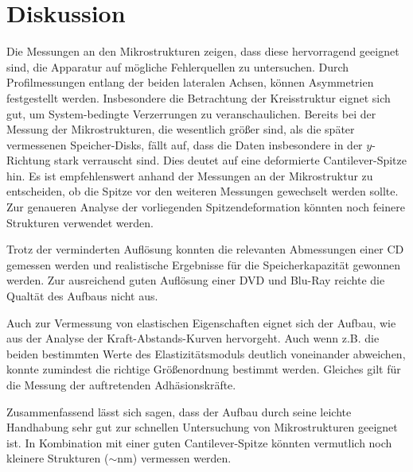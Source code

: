 \newpage
\section{Diskussion}
Die Messungen an den Mikrostrukturen zeigen, dass diese hervorragend geeignet sind, die Apparatur auf
mögliche Fehlerquellen zu untersuchen. Durch Profilmessungen entlang der beiden lateralen Achsen,
können Asymmetrien festgestellt werden. Insbesondere die Betrachtung der Kreisstruktur eignet sich
gut, um System-bedingte Verzerrungen zu veranschaulichen. Bereits bei der Messung der Mikrostrukturen,
die wesentlich größer sind, als die später vermessenen Speicher-Disks, fällt auf, dass die
Daten insbesondere in der $y$-Richtung stark verrauscht sind. Dies deutet auf eine deformierte
Cantilever-Spitze hin. Es ist empfehlenswert anhand der Messungen an der Mikrostruktur zu entscheiden,
ob die Spitze vor den weiteren Messungen gewechselt werden sollte. Zur genaueren Analyse der vorliegenden
Spitzendeformation könnten noch feinere Strukturen verwendet werden.

Trotz der verminderten Auflösung konnten die relevanten Abmessungen einer CD gemessen werden und realistische
Ergebnisse für die Speicherkapazität gewonnen werden. Zur ausreichend guten Auflösung einer
DVD und Blu-Ray reichte die Qualtät des Aufbaus nicht aus.

Auch zur Vermessung von elastischen Eigenschaften eignet sich der Aufbau, wie aus der Analyse der
Kraft-Abstands-Kurven hervorgeht. Auch wenn z.B. die beiden bestimmten Werte des Elastizitätsmoduls
deutlich voneinander abweichen, konnte zumindest die richtige Größenordnung bestimmt werden. Gleiches gilt
für die Messung der auftretenden Adhäsionskräfte.

Zusammenfassend lässt sich sagen, dass der Aufbau durch seine leichte Handhabung sehr gut zur schnellen
Untersuchung von Mikrostrukturen geeignet ist. In Kombination
mit einer guten Cantilever-Spitze könnten vermutlich noch kleinere Strukturen ($\sim \si{\nano\meter}$) vermessen werden.
